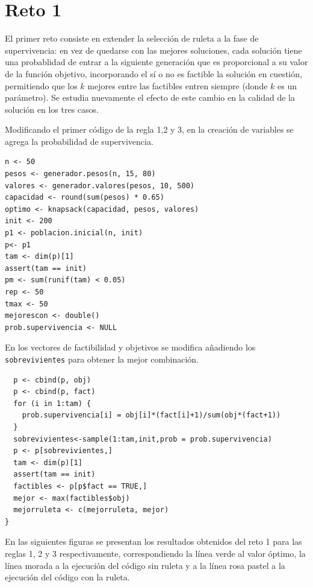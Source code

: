 \documentclass[12pt]{amsart}
\begin{document}
\section{Reto 1}
El primer reto consiste en extender la selección de ruleta a la fase de supervivencia: en vez de quedarse con las mejores soluciones, cada solución tiene una probablidad de entrar a la siguiente generación que es proporcional a su valor de la función objetivo, incorporando el sí o no es factible la solución en cuestión, permitiendo que los $k$ mejores entre las factibles entren siempre (donde $k$ es un parámetro). Se estudia nuevamente el efecto de este cambio en la calidad de la solución en los tres casos.

Modificando el primer código de la regla 1,2 y 3, en la creación de variables se agrega la probabilidad de supervivencia.

\renewcommand{\listingscaption}{Código}
\begin{listing}[H]
  \begin{verbatim}
n <- 50
pesos <- generador.pesos(n, 15, 80)
valores <- generador.valores(pesos, 10, 500)
capacidad <- round(sum(pesos) * 0.65)
optimo <- knapsack(capacidad, pesos, valores)
init <- 200
p1 <- poblacion.inicial(n, init)
p<- p1
tam <- dim(p)[1]
assert(tam == init)
pm <- sum(runif(tam) < 0.05)
rep <- 50
tmax <- 50
mejorescon <- double()
prob.supervivencia <- NULL
  \end{verbatim}
  \label{codigo1}
\end{listing}

\clearpage
En los vectores de factibilidad y objetivos se modifica añadiendo los \texttt{sobrevivientes} para obtener la mejor combinación.

\renewcommand{\listingscaption}{Código}
\begin{listing}[H]
  \begin{verbatim}
  p <- cbind(p, obj)
  p <- cbind(p, fact)
  for (i in 1:tam) {
    prob.supervivencia[i] = obj[i]*(fact[i]+1)/sum(obj*(fact+1))
  }
  sobrevivientes<-sample(1:tam,init,prob = prob.supervivencia)
  p <- p[sobrevivientes,]
  tam <- dim(p)[1]
  assert(tam == init)
  factibles <- p[p$fact == TRUE,]
  mejor <- max(factibles$obj)
  mejorruleta <- c(mejorruleta, mejor)
}
  \end{verbatim}
  \label{codigo1}
\end{listing}

En las siguientes figuras se presentan los resultados obtenidos del reto 1 para las reglas 1, 2 y 3 respectivamente, correspondiendo la línea verde al valor óptimo, la línea morada a la ejecución del código sin ruleta y a la línea rosa pastel a la ejecución del código con la ruleta.
\end{document}
